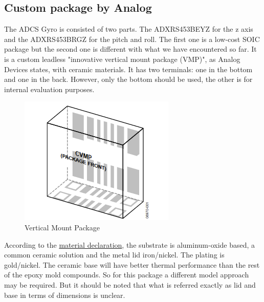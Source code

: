 \documentclass[final]{cubedoc}
\begin{document}
	
	
	\subsection{Custom package by Analog}
	
	The ADCS Gyro is consisted of two parts. The ADXRS453BEYZ for the z axis and the ADXRS453BRGZ for the pitch and roll. The first one is a low-cost SOIC package but the second one is different with what we have encountered so far. It is a custom leadless "innovative vertical mount package (VMP)", as Analog Devices states, with ceramic materials. It has two terminals: one in the bottom and one in the back. However, only the bottom should be used, the other is for internal evaluation purposes. 
	
	\begin{figure}[h!]
		\centering
		\includegraphics[keepaspectratio, height=.3\textheight, width=\textwidth]{docs/vmp.png}
		\caption{Vertical Mount Package}
		\label{fig:my_label}
	\end{figure}
	
	According to the \href{https://web.archive.org/web/20200818133905/https://www.analog.com/media/en/package-pcb-resources/material-declaration/lcc/LCC_V_14L(ey-14-1).PDF}{material declaration}, the substrate is aluminum-oxide based, a common ceramic solution and the metal lid iron/nickel. The plating is gold/nickel. The ceramic base will have better thermal performance than the rest of the epoxy mold compounds. So for this package a different model approach may be required. But it should be noted that what is referred exactly as lid and base in terms of dimensions is unclear. 
	
\end{document}
